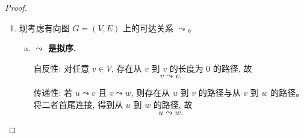 \begin{proof}
\begin{enumerate}[(1)]
\begin{enumerate}[(a)]
          若 $x = 0$, 则由 $y \mid 0$ 与 $0 \mid y$ 可得 $y = 0$,
          故
          \[
            [0]_{\sim} = \set{0}.
          \]

          若 $x \neq 0$, 且 $x \sim y$, 则存在 $a, b \in \Z$ 使得
          \[
            y = ax,
            \qquad
            x = by.
          \]
          于是
          \[
            x = b(ax) = (ab)x.
          \]
          由于 $x \neq 0$, 得
          \[
            ab = 1.
          \]
          在整数中这只可能发生于
          \[
            a = b = 1
            \qquad \text{或} \qquad
            a = b = -1.
          \]
          故 $y = x$ 或 $y = -x$。

          反过来, 显然
          \[
            x \mid x,
            \qquad
            x \mid (-x),
            \qquad
            (-x) \mid x.
          \]
          故当 $x \neq 0$ 时,
          \[
            [x]_{\sim} = \set{x, -x}.
          \]

        \item \textbf{商集上的偏序关系.}

          映射
          \[
            \Phi : \Z/\sim \to \set{0} \cup \Z_{>0},
            \qquad
            \Phi([x]_{\sim}) = |x|
          \]
          是双射, 且
          \[
            [x]_{\sim} \le [y]_{\sim}
            \iff x \mid y
            \iff |x| \mid |y|.
          \]
          因而 $\Z/\sim$ 上的偏序, 就是把正负号压缩之后得到的 ``按绝对值整除'' 的偏序。

        \item \textbf{抽象的含义.}

          等价关系 $\sim$ 把只相差一个符号的整数识别为同一个对象:
          \[
            x \sim y \iff |x| = |y|.
          \]
          因而该抽象忘掉了 ``正负'', 只保留 ``大小的整除结构''。
      \end{enumerate}

    \item 现考虑有向图 $G = (V, E)$ 上的可达关系 $\leadsto$。

      \begin{enumerate}[(a)]
        \item \textbf{$\leadsto$ 是拟序.}

          自反性: 对任意 $v \in V$, 存在从 $v$ 到 $v$ 的长度为 $0$ 的路径,
          故
          \[
            v \leadsto v.
          \]

          传递性: 若 $u \leadsto v$ 且 $v \leadsto w$, 则存在从 $u$ 到 $v$ 的路径与从 $v$ 到 $w$ 的路径。将二者首尾连接, 得到从 $u$ 到 $w$ 的路径, 故
          \[
            u \leadsto w.
          \]


\end{enumerate}
\end{enumerate}
\end{proof}
